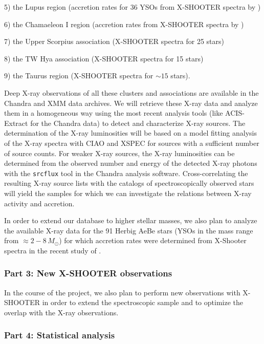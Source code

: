 \documentclass[10pt,fleqn,twoside]{article}
\begin{document}
5) the Lupus region (accretion rates for 36 YSOs from X-SHOOTER spectra by \citet{Alcala14})
\smallskip


6) the Chamaeleon I region (accretion rates from X-SHOOTER spectra by \citet{Manara16})
\smallskip

7) the Upper Scorpius association (X-SHOOTER spectra  for 25 stars)
\smallskip

8) the TW Hya association (X-SHOOTER spectra  for 15 stars)
\smallskip

9) the Taurus region (X-SHOOTER spectra  for $\sim 15$ stars).
\medskip



%
Deep X-ray observations of all these clusters and associations are available in the Chandra and XMM data
archives.  We will retrieve these X-ray data and analyze them in a homogeneous way
using the most recent analysis tools (like ACIS-Extract for the Chandra data) to detect
and characterize X-ray sources. The determination of the X-ray luminosities will be
based on a model fitting analysis of the X-ray spectra with CIAO and XSPEC for sources
with a sufficient number of source counts. For weaker X-ray sources, 
the  X-ray luminosities can be determined from the observed number and energy of the 
detected X-ray photons with the {\tt srcflux} tool in the Chandra analysis software.
Cross-correlating the resulting X-ray source lists with the catalogs of spectroscopically
observed stars will yield the samples for which we can investigate the relations between
X-ray activity and accretion.
\smallskip


In order to extend our database to higher stellar masses, we also plan to analyze 
the available X-ray data for the 91 Herbig AeBe stars (YSOs in the mass range from 
$\approx 2 - 8\,M_\odot$) for which 
accretion rates were determined from X-Shooter spectra in 
the recent study of \citet{Fairlamb16}.


\subsubsection*{Part 3:  New X-SHOOTER observations}

In the course of the project, we also plan to perform new
observations with X-SHOOTER in order to extend the
spectroscopic sample and to optimize the overlap with the X-ray observations.



\subsubsection*{Part 4:  Statistical analysis}
\end{document}
